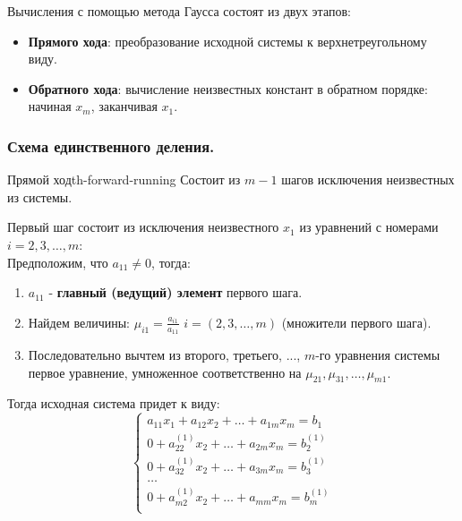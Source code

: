 \documentclass[14pt]{extarticle}
\begin{document}
    Вычисления с помощью метода Гаусса состоят из двух этапов:
    \begin{itemize}
        \item \textbf{Прямого хода}: преобразование исходной системы к верхнетреугольному виду.
        \item \textbf{Обратного хода}: вычисление неизвестных констант в обратном порядке: начиная $x_{m}$, заканчивая $x_{1}$.
    \end{itemize}

    \subsubsection{Схема единственного деления.}

        \begin{theorem}{Прямой ход}{th-forward-running}        
            Состоит из $m - 1$ шагов исключения неизвестных из системы.

            \vspace{\baselineskip}

            Первый шаг состоит из исключения неизвестного $x_{1}$ из уравнений с номерами $i = 2, 3, \ldots, m$:\\
            Предположим, что $a_{11} \neq 0$, тогда: 
            \begin{enumerate}
                \item $a_{11}$ - \textbf{главный (ведущий) элемент} первого шага.
                \item Найдем величины: $\mu_{i1} = \frac{a_{i1}}{a_{11}}$ $i = (2, 3, \ldots, m)$ (множители первого шага).
                \item Последовательно вычтем из второго, третьего, ..., $m$-го уравнения системы первое уравнение, умноженное соответственно на $\mu_{21}, \mu_{31}, \ldots, \mu_{m1}$.
            \end{enumerate}

            \vspace{\baselineskip}

            Тогда исходная система придет к виду:
            $$
            \begin{cases}
                a_{11}x_{1} + a_{12}x_{2} + \ldots + a_{1m}x_m = b_{1} \\
                0 + a_{22}^{(1)}x_{2} + \ldots + a_{2m}x_m = b_{2}^{(1)} \\
                0 + a_{32}^{(1)}x_{2} + \ldots + a_{3m}x_m = b_{3}^{(1)} \\
                \ldots \\
                0 + a_{m2}^{(1)}x_{2} + \ldots + a_{mm}x_m = b_{m}^{(1)} \\
            \end{cases}
            $$


\end{theorem}
\end{document}
